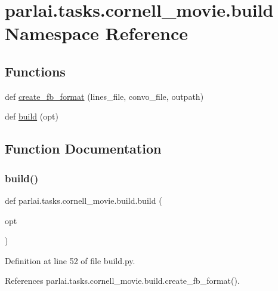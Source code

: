 \hypertarget{namespaceparlai_1_1tasks_1_1cornell__movie_1_1build}{}\section{parlai.\+tasks.\+cornell\+\_\+movie.\+build Namespace Reference}
\label{namespaceparlai_1_1tasks_1_1cornell__movie_1_1build}
\subsection*{Functions}
\begin{DoxyCompactItemize}
\item 
def \hyperlink{namespaceparlai_1_1tasks_1_1cornell__movie_1_1build_ad02efe0879bce0da293ba177112e1af3}{create\+\_\+fb\+\_\+format} (lines\+\_\+file, convo\+\_\+file, outpath)
\item 
def \hyperlink{namespaceparlai_1_1tasks_1_1cornell__movie_1_1build_aced5c0daa1d9fa613eb87535e22f1b47}{build} (opt)
\end{DoxyCompactItemize}


\subsection{Function Documentation}
\mbox{\label{namespaceparlai_1_1tasks_1_1cornell__movie_1_1build_aced5c0daa1d9fa613eb87535e22f1b47}} 
\subsubsection{\texorpdfstring{build()}{build()}}
{\footnotesize\ttfamily def parlai.\+tasks.\+cornell\+\_\+movie.\+build.\+build (\begin{DoxyParamCaption}\item[{}]{opt }\end{DoxyParamCaption})}



Definition at line 52 of file build.\+py.



References parlai.\+tasks.\+cornell\+\_\+movie.\+build.\+create\+\_\+fb\+\_\+format().


